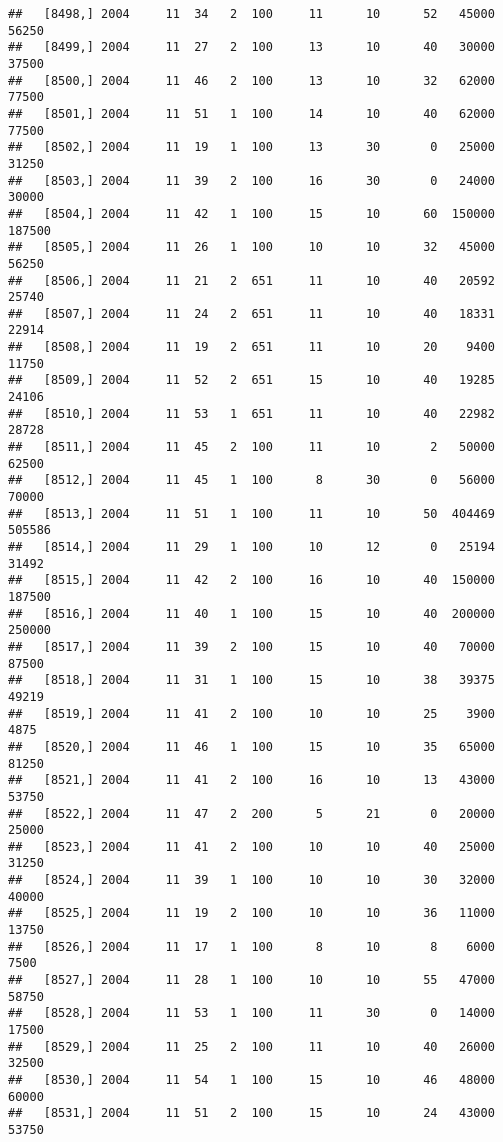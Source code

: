 \documentclass{article}\usepackage[]{graphicx}\usepackage[]{color}
\makeatletter
\newenvironment{kframe}{%
 \def\at@end@of@kframe{}%
 \ifinner\ifhmode%
  \def\at@end@of@kframe{\end{minipage}}%
  \begin{minipage}{\columnwidth}%
 \fi\fi%
 \def\FrameCommand##1{\hskip\@totalleftmargin \hskip-\fboxsep
 \colorbox{shadecolor}{##1}\hskip-\fboxsep
     \hskip-\linewidth \hskip-\@totalleftmargin \hskip\columnwidth}%
 \MakeFramed {\advance\hsize-\width
   \@totalleftmargin\z@ \linewidth\hsize
   \@setminipage}}%
 {\par\unskip\endMakeFramed%
 \at@end@of@kframe}
\newenvironment{knitrout}{}{} %
\makeatother
\begin{document}
\begin{knitrout}
\begin{kframe}
\begin{verbatim}
##   [8498,] 2004     11  34   2  100     11      10      52   45000   56250
##   [8499,] 2004     11  27   2  100     13      10      40   30000   37500
##   [8500,] 2004     11  46   2  100     13      10      32   62000   77500
##   [8501,] 2004     11  51   1  100     14      10      40   62000   77500
##   [8502,] 2004     11  19   1  100     13      30       0   25000   31250
##   [8503,] 2004     11  39   2  100     16      30       0   24000   30000
##   [8504,] 2004     11  42   1  100     15      10      60  150000  187500
##   [8505,] 2004     11  26   1  100     10      10      32   45000   56250
##   [8506,] 2004     11  21   2  651     11      10      40   20592   25740
##   [8507,] 2004     11  24   2  651     11      10      40   18331   22914
##   [8508,] 2004     11  19   2  651     11      10      20    9400   11750
##   [8509,] 2004     11  52   2  651     15      10      40   19285   24106
##   [8510,] 2004     11  53   1  651     11      10      40   22982   28728
##   [8511,] 2004     11  45   2  100     11      10       2   50000   62500
##   [8512,] 2004     11  45   1  100      8      30       0   56000   70000
##   [8513,] 2004     11  51   1  100     11      10      50  404469  505586
##   [8514,] 2004     11  29   1  100     10      12       0   25194   31492
##   [8515,] 2004     11  42   2  100     16      10      40  150000  187500
##   [8516,] 2004     11  40   1  100     15      10      40  200000  250000
##   [8517,] 2004     11  39   2  100     15      10      40   70000   87500
##   [8518,] 2004     11  31   1  100     15      10      38   39375   49219
##   [8519,] 2004     11  41   2  100     10      10      25    3900    4875
##   [8520,] 2004     11  46   1  100     15      10      35   65000   81250
##   [8521,] 2004     11  41   2  100     16      10      13   43000   53750
##   [8522,] 2004     11  47   2  200      5      21       0   20000   25000
##   [8523,] 2004     11  41   2  100     10      10      40   25000   31250
##   [8524,] 2004     11  39   1  100     10      10      30   32000   40000
##   [8525,] 2004     11  19   2  100     10      10      36   11000   13750
##   [8526,] 2004     11  17   1  100      8      10       8    6000    7500
##   [8527,] 2004     11  28   1  100     10      10      55   47000   58750
##   [8528,] 2004     11  53   1  100     11      30       0   14000   17500
##   [8529,] 2004     11  25   2  100     11      10      40   26000   32500
##   [8530,] 2004     11  54   1  100     15      10      46   48000   60000
##   [8531,] 2004     11  51   2  100     15      10      24   43000   53750

\end{verbatim}
\end{kframe}
\end{knitrout}
\end{document}
